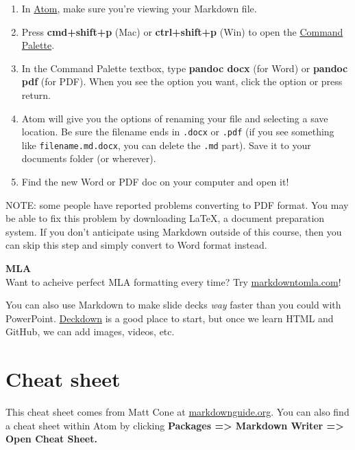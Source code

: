 \documentclass[]{book}
\providecommand{\tightlist}{%
  \setlength{\itemsep}{0pt}\setlength{\parskip}{0pt}}
\theoremstyle{definition}
\theoremstyle{definition}
\theoremstyle{definition}
\theoremstyle{remark}
\begin{document}
\begin{enumerate}
\def\labelenumi{\arabic{enumi}.}
\tightlist
\item
  In \href{https://andylaut.github.io/3844-guidebook/atom.htm}{Atom},
  make sure you're viewing your Markdown file.
\item
  Press \textbf{cmd+shift+p} (Mac) or \textbf{ctrl+shift+p} (Win) to
  open the
  \href{https://andylaut.github.io/3844-guidebook/atom.html\#command-palette}{Command
  Palette}.
\item
  In the Command Palette textbox, type \textbf{pandoc docx} (for Word)
  or \textbf{pandoc pdf} (for PDF). When you see the option you want,
  click the option or press return.
\item
  Atom will give you the options of renaming your file and selecting a
  save location. Be sure the filename ends in \texttt{.docx} or
  \texttt{.pdf} (if you see something like \texttt{filename.md.docx},
  you can delete the \texttt{.md} part). Save it to your documents
  folder (or wherever).
\item
  Find the new Word or PDF doc on your computer and open it!
\end{enumerate}

NOTE: some people have reported problems converting to PDF format. You
may be able to fix this problem by downloading LaTeX, a document
preparation system. If you don't anticipate using Markdown outside of
this course, then you can skip this step and simply convert to Word
format instead.

\textbf{MLA}\\
Want to acheive perfect MLA formatting every time? Try
\href{http://markdowntomla.com/}{markdowntomla.com}!

You can also use Markdown to make slide decks \emph{way} faster than you
could with PowerPoint. \href{http://deckdown.org/}{Deckdown} is a good
place to start, but once we learn HTML and GitHub, we can add images,
videos, etc.

\hypertarget{cheat-sheet}{%
\section{Cheat sheet}\label{cheat-sheet}}

This cheat sheet comes from Matt Cone at
\href{https://www.markdownguide.org/cheat-sheet/}{markdownguide.org}.
You can also find a cheat sheet within Atom by clicking \textbf{Packages
=\textgreater{} Markdown Writer =\textgreater{} Open Cheat Sheet.}
\end{document}

